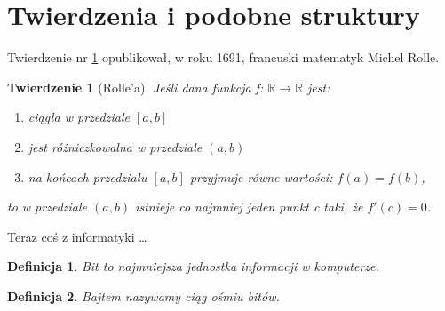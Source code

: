 \documentclass[data-science]{agh-wi} %
\newtheorem{theorem}{Twierdzenie}
\newtheorem{definition}{Definicja}
\begin{document}
\section{Twierdzenia i podobne struktury}
Twierdzenie nr \ref{tw} opublikował, w roku 1691, francuski matematyk Michel Rolle.
\begin{theorem}[Rolle'a]
    \label{tw}
    Jeśli dana funkcja f: $\mathbb R \to \mathbb R$ jest:
    \begin{enumerate}
        \item ciągła w przedziale $[a,b]$
        \item jest różniczkowalna w przedziale $(a,b)$
        \item na końcach przedziału $[a,b]$ przyjmuje równe wartości: $f(a) = f(b)$,
    \end{enumerate}
    to w przedziale $(a,b)$ istnieje co najmniej jeden punkt c taki, że $f'(c) = 0$.
\end{theorem}

Teraz coś z informatyki \ldots
\begin{definition}
    Bit to najmniejsza jednostka informacji w komputerze.
\end{definition}
\begin{definition}
    Bajtem nazywamy ciąg ośmiu bitów.
\end{definition}
\backmatter %
\end{document}
